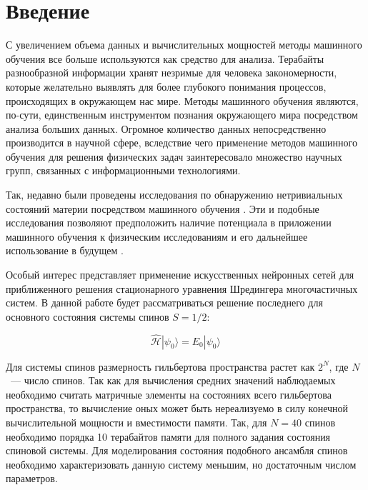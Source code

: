 \chapter*{Введение}

С увеличением объема данных и вычислительных мощностей методы машинного обучения все больше используются как средство для анализа. 
Терабайты разнообразной информации хранят незримые для человека закономерности, которые желательно выявлять для более глубокого понимания процессов, происходящих в окружающем нас мире. 
Методы машинного обучения являются, по-сути, единственным инструментом познания окружающего мира посредством анализа больших данных.
Огромное количество данных непосредственно производится в научной сфере, вследствие чего применение методов машинного обучения для решения физических задач заинтересовало множество научных групп, связанных с информационными технологиями.

Так, недавно были проведены исследования по обнаружению нетривиальных состояний материи посредством машинного обучения \cite{carrasquilla2017machine}.
Эти и подобные исследования позволяют предположить наличие потенциала в приложении машинного обучения к физическим исследованиям и его дальнейшее использование в будущем \cite{butler2018machine}.

Особый интерес представляет применение искусственных нейронных сетей для приближенного решения стационарного уравнения Шредингера многочастичных систем. В данной работе будет рассматриваться решение последнего для основного состояния системы спинов $S=1/2$:

\begin{equation*}
\hat{\mathcal{H}} | \psi_0 \rangle=E_0 | \psi_0 \rangle
\end{equation*}

Для системы спинов размерность гильбертова пространства растет как $2^{N}$, где $N$~--- число спинов. 
Так как для вычисления средних значений наблюдаемых необходимо считать матричные элементы на состояниях всего гильбертова пространства, то вычисление оных может быть нереализуемо в силу конечной вычислительной мощности и вместимости памяти. 
Так, для $N=40$ спинов необходимо порядка 10 терабайтов памяти для полного задания состояния спиновой системы.
Для моделирования состояния подобного ансамбля спинов необходимо характеризовать данную систему меньшим, но достаточным числом параметров.

